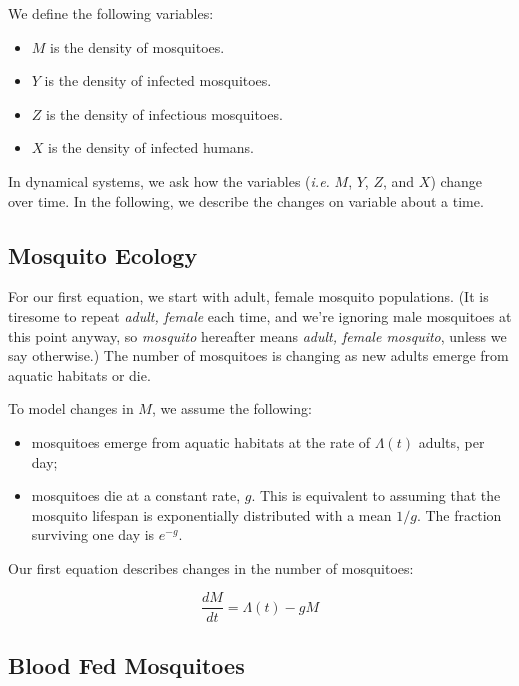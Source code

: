 \documentclass[
]{book}
\begin{document}
We define the following variables:

\begin{itemize}
\item
  \(M\) is the density of mosquitoes.
\item
  \(Y\) is the density of infected mosquitoes.
\item
  \(Z\) is the density of infectious mosquitoes.
\item
  \(X\) is the density of infected humans.
\end{itemize}

In dynamical systems, we ask how the variables (\emph{i.e.} \(M\), \(Y\), \(Z\), and \(X\)) change over time. In the following, we describe the changes on variable about a time.

\hypertarget{mosquito-ecology}{%
\subsection{Mosquito Ecology}\label{mosquito-ecology}}

For our first equation, we start with adult, female mosquito populations. (It is tiresome to repeat \emph{adult, female} each time, and we're ignoring male mosquitoes at this point anyway, so \emph{mosquito} hereafter means \emph{adult, female mosquito}, unless we say otherwise.) The number of mosquitoes is changing as new adults emerge from aquatic habitats or die.

To model changes in \(M\), we assume the following:

\begin{itemize}
\item
  mosquitoes emerge from aquatic habitats at the rate of \(\Lambda(t)\) adults, per day;
\item
  mosquitoes die at a constant rate, \(g\). This is equivalent to assuming that the mosquito lifespan is exponentially distributed with a mean \(1/g\). The fraction surviving one day is \(e^{-g}\).
\end{itemize}

Our first equation describes changes in the number of mosquitoes:

\begin{equation}
\frac{dM}{dt} = \Lambda(t) - g M
\end{equation}

\hypertarget{blood-fed-mosquitoes}{%
\subsection{Blood Fed Mosquitoes}\label{blood-fed-mosquitoes}}
\end{document}
